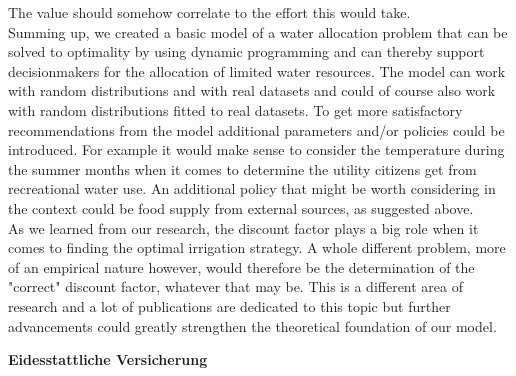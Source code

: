 \documentclass[12pt, a4paper, oneside]{article}
\begin{document}
The value should somehow correlate to the effort this would take.
\\
Summing up, we created a basic model of a water allocation problem that can be solved to optimality by using dynamic programming and can thereby support decisionmakers for the allocation of limited water resources.
The model can work with random distributions and with real datasets and could of course also work with random distributions fitted to real datasets.
To get more satisfactory recommendations from the model additional parameters and/or policies could be introduced.
For example it would make sense to consider the temperature during the summer months when it comes to determine the utility citizens get from recreational water use.
An additional policy that might be worth considering in the context could be food supply from external sources, as suggested above.
\\
As we learned from our research, the discount factor plays a big role when it comes to finding the optimal irrigation strategy.
A whole different problem, more of an empirical nature however, would therefore be the determination of the "correct" discount factor, whatever that may be.
This is a different area of research and a lot of publications are dedicated to this topic but further advancements could greatly strengthen the theoretical foundation of our model.


\clearpage
\printbibliography

\newpage






\pagestyle{empty} 
\begingroup
\begin{center}
	\large
	\textbf{Eidesstattliche Versicherung}
\end{center}

\vspace{0.3cm}
\end{document}
